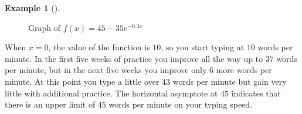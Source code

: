 \documentclass[10pt,]{book}
\theoremstyle{plain}
\theoremstyle{definition}
\theoremstyle{definition}
\newtheorem{example}[theorem]{Example}
\theoremstyle{definition}
\numberwithin{equation}{section}
\begin{document}
\begin{example}[]
\begin{figure}
{
}
\caption{Graph of \(f(x) = 45 - 35e^{-0.3x}\)\label{figure-exp-comp-pt3}}
\end{figure}
\hypertarget{p-249}{}%
When \(x=0\), the value of the function is \(10\), so you start typing at \(10\) words per minute.  In the first five weeks of practice you improve all the way up to \(37\) words per minute, but in the next five weeks you improve only \(6\) more words per minute.  At this point you type a little over \(43\) words per minute but gain very little with additional practice.  The horizontal asymptote at \(45\) indicates that there is an upper limit of \(45\) words per minute on your typing speed.%
\end{example}
\end{document}
